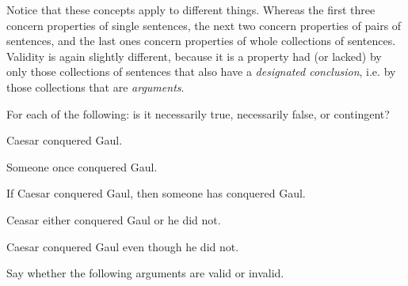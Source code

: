 Notice that these concepts apply to different things. Whereas the first three concern properties of single sentences, the next two concern properties of pairs of sentences, and the last ones concern properties of whole collections of sentences.  Validity is again slightly different, because it is a property had (or lacked) by only those collections of sentences that also have a \emph{designated conclusion}, i.e. by those collections that are \emph{arguments}.    

\practiceproblems
\problempart
\label{pr.EnglishTautology}
For each of the following: is it necessarily true, necessarily false, or contingent?
\begin{earg}
\item Caesar conquered Gaul.
\item Someone once conquered Gaul.
\item If Caesar conquered Gaul, then someone has conquered Gaul.
\item Ceasar either conquered Gaul or he did not.
\item Caesar conquered Gaul even though he did not.
\end{earg}

\problempart Say whether the following arguments are valid or invalid.

